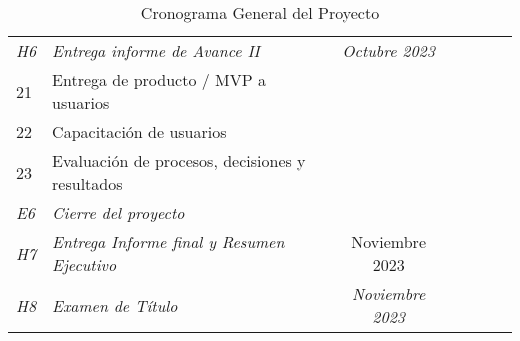 \begin{table}[H]
{\begin{tabular}{@{}llllllll@{}}
			\textit{H6}                                        & \textit{Entrega informe de Avance II}               & \multicolumn{2}{c}{\textit{Octubre 2023}}    &  &  &  &     \\
			21                                                 & Entrega de producto / MVP a usuarios                &                                              &  &  &  &   & \\
			22                                                 & Capacitación de usuarios                            &                                              &  &  &  &   & \\
			23                                                 & Evaluación de procesos, decisiones y resultados     &                                              &  &  &  &   & \\
			\textit{E6}                                        & \textit{Cierre del proyecto}                        &                                              &  &  &  &   & \\
			\textit{H7}                                        &
			\textit{Entrega Informe final y Resumen Ejecutivo} &
			\multicolumn{2}{c}{Noviembre 2023}                 &
			                                                   &
			                                                   &
			                                                   &
			\\
			\textit{H8}                                        & \textit{Examen de Título}                           & \multicolumn{2}{c}{\textit{Noviembre 2023}}  &  &  &  &     \\ \bottomrule
		\end{tabular}%
	}
	\caption{Cronograma General del Proyecto}
	\label{tab:cronograma}
\end{table}
